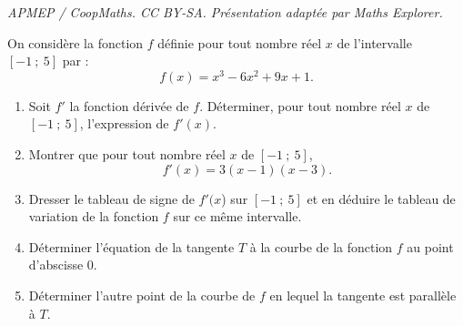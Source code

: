 \documentclass[10pt]{article}
\begin{document}
\noindent\textit{APMEP / CoopMaths. CC BY-SA. Présentation adaptée par Maths Explorer.}\par\medskip
\medskip

On considère la fonction $f$ définie pour tout nombre réel $x$  de l'intervalle $[-1~;~5]$ par : \[f(x)=x^3-6x^2+9x+1.\]

\begin{enumerate}
\item  Soit $f'$ la fonction dérivée de $f$. Déterminer, pour tout nombre réel $x$ de $[-1~;~5]$, l'expression de $f'(x)$.
\item Montrer que pour tout nombre réel $x$ de $[-1~;~5]$, \[f'(x) = 3(x - 1)(x - 3).\]
\item Dresser le tableau de signe de $f'(x$) sur $[-1~;~5]$ et en déduire le tableau de variation de la fonction $f$ sur ce même intervalle.
\item Déterminer l'équation de la tangente $T$ à la courbe de la fonction $f$ au point d'abscisse $0$.
\item Déterminer l'autre point de la courbe de $f$ en lequel la tangente est parallèle à $T$.
\end{enumerate}
\end{document}
